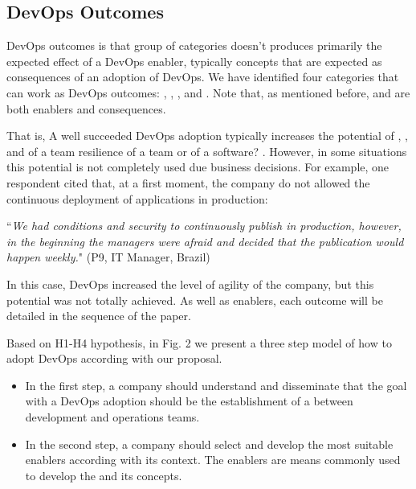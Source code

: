{\subsection{DevOps Outcomes}

DevOps outcomes is that group of categories doesn't produces primarily the
expected effect of a DevOps enabler, typically concepts that are expected as
consequences of an adoption of DevOps. We have identified four categories that
can work as DevOps outcomes: , ,
, and . Note that, 
as mentioned before,  and  
are both enablers and consequences. 

That is, A well succeeded DevOps adoption typically increases the potential of
, ,  and 
 of a team {\color{red}resilience of a team or of a software?} .
However, in some situations this potential is not completely used due business
decisions. For example, one respondent cited that, at a first moment, the
company do not allowed the continuous deployment of applications in production:

\begin{mq}
``\emph{We had conditions and security to continuously publish in production,
however, in the beginning the managers were afraid and decided that the
publication would happen weekly.}" (P9, IT Manager, Brazil)
\end{mq}

In this case, DevOps increased the level of agility of the company, but this
potential was not totally achieved. As well as enablers, each outcome 
will be detailed in the sequence of the paper.

Based on H1-H4 hypothesis, in Fig. 2 we present a three step model of how to
adopt DevOps according with our proposal.

\begin{itemize}
\item In the first step, a company should  understand and 
disseminate that the goal with a DevOps adoption should be
the establishment of a  between 
development and operations teams.

\item In the second step, a company should select and develop 
the most suitable enablers according with its context. The enablers 
are means commonly used to develop the  
and its concepts.


\end{itemize}}
